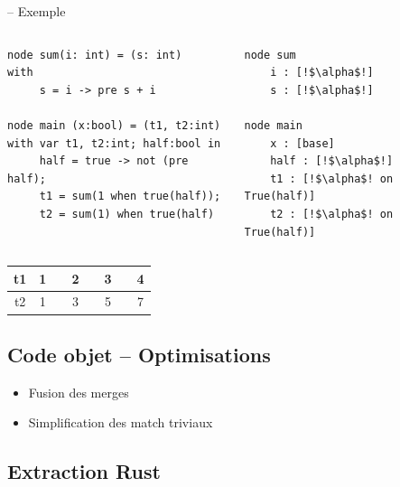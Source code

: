 \documentclass[11pt,usenames,dvipsnames]{beamer}
\begin{document}
\begin{frame}[fragile]{-- Exemple}
  \begin{columns}
    \begin{column}{0.5\textwidth}
      \begin{lstlisting}[language=minils]
node sum(i: int) = (s: int)
with
     s = i -> pre s + i

node main (x:bool) = (t1, t2:int)
with var t1, t2:int; half:bool in
     half = true -> not (pre half);
     t1 = sum(1 when true(half));
     t2 = sum(1) when true(half)
   \end{lstlisting}
 \end{column}
 \begin{column}{0.5\textwidth}
   \pause
   \begin{lstlisting}[escapechar=!]
node sum
    i : [!$\alpha$!]
    s : [!$\alpha$!]

node main
    x : [base]
    half : [!$\alpha$!]
    t1 : [!$\alpha$! on True(half)]
    t2 : [!$\alpha$! on True(half)]
  \end{lstlisting}
 \end{column}
\end{columns}
\pause
\begin{center}
  \begin{tabular}{|c|ccccccc|}
    \hline
    t1    & 1 &  & 2 & & 3 & & 4\\
    \hline
    t2    & 1 &  & 3 & & 5 & & 7\\
    \hline
  \end{tabular}
\end{center}
\end{frame}

\subsection{Code objet -- Optimisations}
\begin{frame}{\null}
  \begin{itemize}
  \item<1-> Fusion des merges
  \item<2-> Simplification des match triviaux
  \end{itemize}
\end{frame}

\subsection{Extraction Rust}
\end{document}
